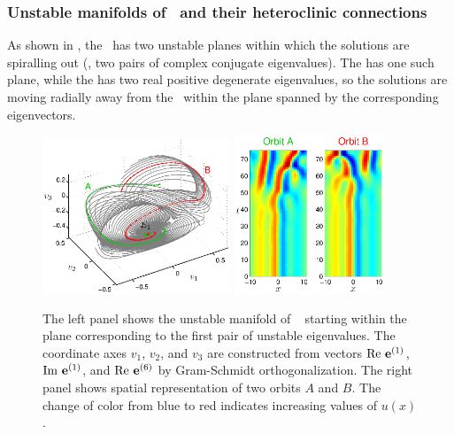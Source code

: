 \subsubsection{Unstable manifolds of \eqva\ and their heteroclinic
            connections}
\label{sec:unstMnflds}

As shown in ,
the  \eqv\ has two unstable
planes within which the solutions are spiralling out (\ie, two
pairs of complex conjugate eigenvalues).  The  has one such plane,
while the  has two real positive degenerate eigenvalues, so the solutions are
moving radially away from the \eqv\ within the plane spanned
by the corresponding eigenvectors.  %

\begin{figure}[h!t]
\begin{center}
 \includegraphics[width=0.5\textwidth]{../figs/ks22_E1_plane1_manifold_c}
 \includegraphics[width=0.4\textwidth]{../figs/ks22_E1_plane1_orbits_c}
\end{center}
\caption[Unstable manifold of \eqv\ ]{
The left panel shows the unstable
manifold of \eqv\  starting within the plane
corresponding to the first pair of unstable eigenvalues. The
coordinate axes $v_1$, $v_2$, and $v_3$ are constructed from vectors
$\rm Re\, \,{\mathbf e}^{(1)}$, $\rm Im\, \,{\mathbf e}^{(1)}$,
and $\rm Re\, \,{\mathbf e}^{(6)}$
by Gram-Schmidt orthogonalization.
The right panel shows spatial representation of two orbits $A$ and $B$.
The change of color from blue to red indicates increasing values of
$u(x)$.
}
\label{f:KS22E1man1}
\end{figure}

